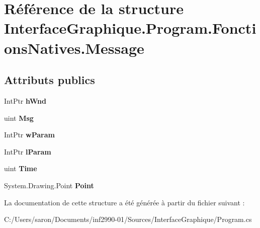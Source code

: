 \hypertarget{struct_interface_graphique_1_1_program_1_1_fonctions_natives_1_1_message}{\section{Référence de la structure Interface\-Graphique.\-Program.\-Fonctions\-Natives.\-Message}
\label{struct_interface_graphique_1_1_program_1_1_fonctions_natives_1_1_message}
}
\subsection*{Attributs publics}
\begin{DoxyCompactItemize}
\item 
\hypertarget{struct_interface_graphique_1_1_program_1_1_fonctions_natives_1_1_message_a79723506feb45f5c0d016e2c4d1322ed}{Int\-Ptr {\bfseries h\-Wnd}}\label{struct_interface_graphique_1_1_program_1_1_fonctions_natives_1_1_message_a79723506feb45f5c0d016e2c4d1322ed}

\item 
\hypertarget{struct_interface_graphique_1_1_program_1_1_fonctions_natives_1_1_message_a89e12a8f443b5c702f97d60bb89ea92d}{uint {\bfseries Msg}}\label{struct_interface_graphique_1_1_program_1_1_fonctions_natives_1_1_message_a89e12a8f443b5c702f97d60bb89ea92d}

\item 
\hypertarget{struct_interface_graphique_1_1_program_1_1_fonctions_natives_1_1_message_a69a29b0891227cbc5365ba450e36f0ce}{Int\-Ptr {\bfseries w\-Param}}\label{struct_interface_graphique_1_1_program_1_1_fonctions_natives_1_1_message_a69a29b0891227cbc5365ba450e36f0ce}

\item 
\hypertarget{struct_interface_graphique_1_1_program_1_1_fonctions_natives_1_1_message_a80b40861c5792897ce18ddeeda6cf269}{Int\-Ptr {\bfseries l\-Param}}\label{struct_interface_graphique_1_1_program_1_1_fonctions_natives_1_1_message_a80b40861c5792897ce18ddeeda6cf269}

\item 
\hypertarget{struct_interface_graphique_1_1_program_1_1_fonctions_natives_1_1_message_a35f8a6545e405ca37256b2f25e1d4265}{uint {\bfseries Time}}\label{struct_interface_graphique_1_1_program_1_1_fonctions_natives_1_1_message_a35f8a6545e405ca37256b2f25e1d4265}

\item 
\hypertarget{struct_interface_graphique_1_1_program_1_1_fonctions_natives_1_1_message_a55b388f7eb95f804564f1d68c30c2422}{System.\-Drawing.\-Point {\bfseries Point}}\label{struct_interface_graphique_1_1_program_1_1_fonctions_natives_1_1_message_a55b388f7eb95f804564f1d68c30c2422}

\end{DoxyCompactItemize}


La documentation de cette structure a été générée à partir du fichier suivant \-:\begin{DoxyCompactItemize}
\item 
C\-:/\-Users/saron/\-Documents/inf2990-\/01/\-Sources/\-Interface\-Graphique/Program.\-cs\end{DoxyCompactItemize}
